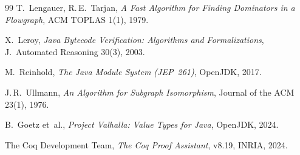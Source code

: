 ﻿\documentclass[a4paper,12pt]{article}
\theoremstyle{definition}
\begin{document}
\begin{thebibliography}{99}
T.~Lengauer, R.\,E.~Tarjan,
\textit{A Fast Algorithm for Finding Dominators in a Flowgraph},
ACM TOPLAS 1(1), 1979.

X.~Leroy,
\textit{Java Bytecode Verification: Algorithms and Formalizations},
J.~Automated Reasoning 30(3), 2003.

M.~Reinhold,
\textit{The Java Module System (JEP~261)}, OpenJDK, 2017.

J.\,R.~Ullmann,
\textit{An Algorithm for Subgraph Isomorphism},
Journal of the ACM 23(1), 1976.

B.~Goetz et~al.,
\textit{Project Valhalla: Value Types for Java}, OpenJDK, 2024.

The Coq Development Team,
\textit{The Coq Proof Assistant}, v8.19, INRIA, 2024.

\end{thebibliography}
\end{document}
